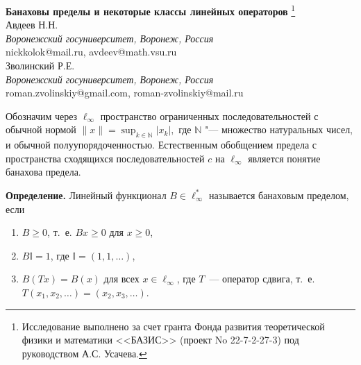 \documentclass[a4paper,14pt]{article}
\begin{document}
	\pagestyle{fancy}
	\fancyhead{}
	\fancyfoot{}
	\fancyfoot[R]{\footnotesize{}}
	\renewcommand{\footrulewidth}{0.1 mm}

	\begin{center}
		\textbf{Банаховы пределы и некоторые классы линейных операторов}%
		\footnote{%
			Исследование выполнено за счет гранта Фонда развития теоретической физики и математики <<БАЗИС>>
			(проект No 22-7-2-27-3) под руководством А.С. Усачева.}\\
		\vspace{\baselineskip}
		Авдеев Н.Н.\\
		\emph{Воронежский госуниверситет, Воронеж, Россия}\\nickkolok@mail.ru, avdeev@math.vsu.ru
		\vspace{\baselineskip}\\
		Зволинский Р.Е.\\
		\emph{Воронежский госуниверситет, Воронеж, Россия}\\roman.zvolinskiy@gmail.com, roman-zvolinskiy@mail.ru
		\vspace{\baselineskip}\\
	\end{center}
	\vspace{\baselineskip}

	\setcounter{equation}{0}
	\setcounter{figure}{0}

	Обозначим через $\ell_\infty$ пространство ограниченных последовательностей с обычной нормой
	$
	\|x\| = \sup_{k\in\mathbb{N}} |x_k|
	,
	$
	где $\mathbb{N}$ "--- множество натуральных чисел, и обычной полуупорядоченностью.
	Естественным обобщением предела с пространства сходящихся последовательностей $c$ на $\ell_\infty$
	является понятие банахова предела.

	\textbf{Определение.}
	Линейный функционал $B\in \ell_\infty^*$ называется банаховым пределом,
	если
	\begin{enumerate}
		\item
		$B\geq0$, т.~е. $Bx \geq 0$ для $x \geq 0$,
		\item
		$B\mathbb{I}=1$, где $\mathbb{I} =(1,1,\ldots)$,
		\item
		$B(Tx)=B(x)$ для всех $x\in \ell_\infty$, где $T$~---
		оператор сдвига, т.~е. $T(x_1,x_2,\ldots)=(x_2,x_3,\ldots)$.
	\end{enumerate}
\end{document}
